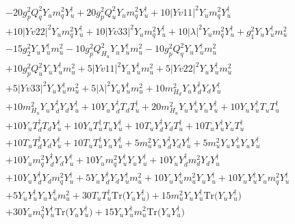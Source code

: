 \begin{align}
 &-20 g_{p}^{2} Q_{q}^{2} {Y_u  m_q^2  Y_{u}^{\dagger}} +20 g_{p}^{2} Q_{u}^{2} {Y_u  m_q^2  Y_{u}^{\dagger}} +10 |Yv11|^2 {Y_u  m_q^2  Y_{u}^{\dagger}} \nonumber \\ 
 &+10 |Yv22|^2 {Y_u  m_q^2  Y_{u}^{\dagger}} +10 |Yv33|^2 {Y_u  m_q^2  Y_{u}^{\dagger}} +10 |\lambda|^2 {Y_u  m_q^2  Y_{u}^{\dagger}} +g_{1}^{2} {Y_u  Y_{u}^{\dagger}  m_u^2} \nonumber \\ 
 &-15 g_{2}^{2} {Y_u  Y_{u}^{\dagger}  m_u^2} -10 g_{p}^{2} Q_{H_u}^{2} {Y_u  Y_{u}^{\dagger}  m_u^2} -10 g_{p}^{2} Q_{q}^{2} {Y_u  Y_{u}^{\dagger}  m_u^2} \nonumber \\ 
 &+10 g_{p}^{2} Q_{u}^{2} {Y_u  Y_{u}^{\dagger}  m_u^2} +5 |Yv11|^2 {Y_u  Y_{u}^{\dagger}  m_u^2} +5 |Yv22|^2 {Y_u  Y_{u}^{\dagger}  m_u^2} \nonumber \\ 
 &+5 |Yv33|^2 {Y_u  Y_{u}^{\dagger}  m_u^2} +5 |\lambda|^2 {Y_u  Y_{u}^{\dagger}  m_u^2} +10 m_{H_d}^2 {Y_u  Y_{d}^{\dagger}  Y_d  Y_{u}^{\dagger}} \nonumber \\ 
 &+10 m_{H_u}^2 {Y_u  Y_{d}^{\dagger}  Y_d  Y_{u}^{\dagger}} +10 {Y_u  Y_{d}^{\dagger}  T_d  T_{u}^{\dagger}} +20 m_{H_u}^2 {Y_u  Y_{u}^{\dagger}  Y_u  Y_{u}^{\dagger}} +10 {Y_u  Y_{u}^{\dagger}  T_u  T_{u}^{\dagger}} \nonumber \\ 
 &+10 {Y_u  T_{d}^{\dagger}  T_d  Y_{u}^{\dagger}} +10 {Y_u  T_{u}^{\dagger}  T_u  Y_{u}^{\dagger}} +10 {T_u  Y_{d}^{\dagger}  Y_d  T_{u}^{\dagger}} +10 {T_u  Y_{u}^{\dagger}  Y_u  T_{u}^{\dagger}} \nonumber \\ 
 &+10 {T_u  T_{d}^{\dagger}  Y_d  Y_{u}^{\dagger}} +10 {T_u  T_{u}^{\dagger}  Y_u  Y_{u}^{\dagger}} +5 {m_u^2  Y_u  Y_{d}^{\dagger}  Y_d  Y_{u}^{\dagger}} +5 {m_u^2  Y_u  Y_{u}^{\dagger}  Y_u  Y_{u}^{\dagger}} \nonumber \\ 
 &+10 {Y_u  m_q^2  Y_{d}^{\dagger}  Y_d  Y_{u}^{\dagger}} +10 {Y_u  m_q^2  Y_{u}^{\dagger}  Y_u  Y_{u}^{\dagger}} +10 {Y_u  Y_{d}^{\dagger}  m_d^2  Y_d  Y_{u}^{\dagger}} \nonumber \\ 
 &+10 {Y_u  Y_{d}^{\dagger}  Y_d  m_q^2  Y_{u}^{\dagger}} +5 {Y_u  Y_{d}^{\dagger}  Y_d  Y_{u}^{\dagger}  m_u^2} +10 {Y_u  Y_{u}^{\dagger}  m_u^2  Y_u  Y_{u}^{\dagger}} +10 {Y_u  Y_{u}^{\dagger}  Y_u  m_q^2  Y_{u}^{\dagger}} \nonumber \\ 
 &+5 {Y_u  Y_{u}^{\dagger}  Y_u  Y_{u}^{\dagger}  m_u^2} +30 {T_u  T_{u}^{\dagger}} \mbox{Tr}\Big({Y_u  Y_{u}^{\dagger}}\Big) +15 {m_u^2  Y_u  Y_{u}^{\dagger}} \mbox{Tr}\Big({Y_u  Y_{u}^{\dagger}}\Big) \nonumber \\ 
 &+30 {Y_u  m_q^2  Y_{u}^{\dagger}} \mbox{Tr}\Big({Y_u  Y_{u}^{\dagger}}\Big) +15 {Y_u  Y_{u}^{\dagger}  m_u^2} \mbox{Tr}\Big({Y_u  Y_{u}^{\dagger}}\Big) \nonumber \\ 

\end{align}
